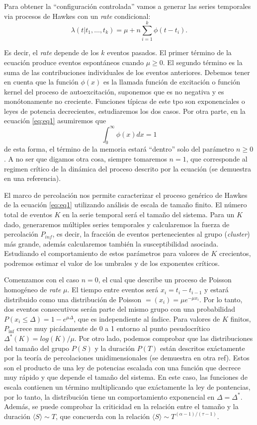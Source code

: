 \documentclass[a4paper,11pt]{book}
\begin{document}
Para obtener la ``configuración controlada'' vamos a generar las series temporales via procesos de Hawkes con un \textit{rate} condicional:
\begin{equation}
    \lambda(t|t_1,\ldots,t_k) = \mu+ n\sum_{i=1}^{k}\phi(t-t_i).
    \label{eq:eq1}
\end{equation}

Es decir, el \textit{rate} depende de los $k$ eventos pasados. El primer término de la ecuación produce eventos espontáneos cuando $\mu\geq0$. El 
segundo término es la suma de las contribuciones individuales de los eventos anteriores. Debemos tener en cuenta que la función $\phi(x)$ es la 
llamada función de excitación o función kernel del proceso de autoexcitación, suponemos que es no negativa y es monótonamente no creciente. Funciones típicas 
de este tpo son exponenciales o leyes de potencia decrecientes, estudiaremos los dos casos. Por otra parte, en la ecuación \ref{eq:eq1} asumiremos que 
$$\int_{0}^{\infty}\phi(x)dx=1$$
de esta forma, el término de la memoria estará ``dentro'' solo del parámetro $n\geq0$. A no ser que digamos otra cosa, siempre tomaremos $n=1$, que 
corresponde al regimen crítico de la dinámica del proceso descrito por la ecuación (se demuestra en una referencia).

El marco de percolación nos permite caracterizar el proceso genérico de Hawkes de la ecuación \ref{eq:eq1} utilizando análisis de escala de tamaño finito.
El número total de eventos $K$ en la serie temporal será el tamaño del sistema. Para un $K$ dado, generaremos múltiples series temporales y calcularemos 
la fuerza de percolación $P_{inf}$, es decir, la fracción de eventos pertenecientes al grupo (\textit{cluster}) más grande, además calcularemos 
también la susceptibilidad asociada. Estudiando el comportamiento de estos parámetros para valores de $K$ crecientos, podremos estimar el valor de los 
umbrales y de los exponentes críticos.

Comenzamos con el caso $n=0$, el cual que describe un proceso de Poisson homogéneo de \textit{rate} $\mu$. El tiempo entre eventos será $x_i=t_i-t_{i-1}$
y estará distribuido como una distribución de Poisson $=(x_i)=\mu e^{-\mu x_i}$. Por lo tanto, dos eventos consecutivos serán parte del mismo grupo con 
una probabilidad $P(x_i \leq \Delta)=1-e^{\mu\Delta}$, que es independiente al índice. Para valores de $K$ finitos, $P_{\inf}$ crece muy picádamente de 0 
a 1 entorno al punto pesudocrítico $\Delta^*(K)=log(K)/\mu$. Por otro lado, podemos comprobar que las distribuciones del tamaño del grupo $P(S)$ y la 
duración $P(T)$ están descritos exáctamente por la teoría de percolaciones unidimensionales (se demuestra en otra ref). Estos son el producto de una ley 
de potencias escalada con una función que decrece muy rápido y que depende el tamaño del sistema. En este caso, las funciones de escala contienen un 
término multiplicando que exáctamente la ley de pontencias, por lo tanto, la distribución tiene un comportamiento exponencial en $\Delta=\Delta^*$.
Además, se puede comprobar la criticidad en la relación entre el tamaño y la duración $\langle S\rangle\sim T$, que concuerda con la relación 
$\langle S\rangle\sim T^{(\alpha-1)/(\tau-1)}$.
\end{document}
